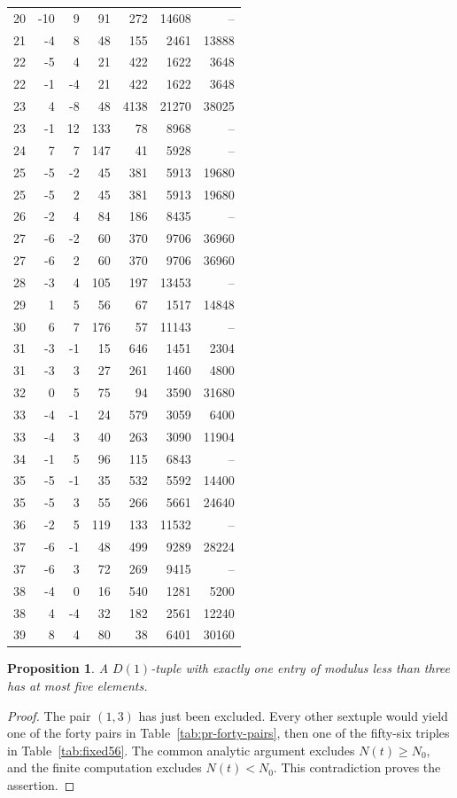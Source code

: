 \documentclass[12pt]{article}
\newtheorem{proposition}[theorem]{Proposition}
\numberwithin{equation}{section}
\begin{document}
\begin{longtable}{r|r r|r|r|r|r}
20 & -10 & 9 & 91 & 272 & 14608 & -- \\
21 & -4 & 8 & 48 & 155 & 2461 & 13888 \\
22 & -5 & 4 & 21 & 422 & 1622 & 3648 \\
22 & -1 & -4 & 21 & 422 & 1622 & 3648 \\
23 & 4 & -8 & 48 & 4138 & 21270 & 38025 \\
23 & -1 & 12 & 133 & 78 & 8968 & -- \\
24 & 7 & 7 & 147 & 41 & 5928 & -- \\
25 & -5 & -2 & 45 & 381 & 5913 & 19680 \\
25 & -5 & 2 & 45 & 381 & 5913 & 19680 \\
26 & -2 & 4 & 84 & 186 & 8435 & -- \\
27 & -6 & -2 & 60 & 370 & 9706 & 36960 \\
27 & -6 & 2 & 60 & 370 & 9706 & 36960 \\
28 & -3 & 4 & 105 & 197 & 13453 & -- \\
29 & 1 & 5 & 56 & 67 & 1517 & 14848 \\
30 & 6 & 7 & 176 & 57 & 11143 & -- \\
31 & -3 & -1 & 15 & 646 & 1451 & 2304 \\
31 & -3 & 3 & 27 & 261 & 1460 & 4800 \\
32 & 0 & 5 & 75 & 94 & 3590 & 31680 \\
33 & -4 & -1 & 24 & 579 & 3059 & 6400 \\
33 & -4 & 3 & 40 & 263 & 3090 & 11904 \\
34 & -1 & 5 & 96 & 115 & 6843 & -- \\
35 & -5 & -1 & 35 & 532 & 5592 & 14400 \\
35 & -5 & 3 & 55 & 266 & 5661 & 24640 \\
36 & -2 & 5 & 119 & 133 & 11532 & -- \\
37 & -6 & -1 & 48 & 499 & 9289 & 28224 \\
37 & -6 & 3 & 72 & 269 & 9415 & -- \\
38 & -4 & 0 & 16 & 540 & 1281 & 5200 \\
38 & 4 & -4 & 32 & 182 & 2561 & 12240 \\
39 & 8 & 4 & 80 & 38 & 6401 & 30160 \\
\end{longtable}
\begin{proposition}\label{prop:one-small}
A $D(1)$-tuple with exactly one entry of modulus less than three has
at most five elements.
\end{proposition}
\begin{proof}
The pair $(1,3)$ has just been excluded. Every other sextuple would
yield one of the forty pairs in Table~\ref{tab:pr-forty-pairs}, then
one of the fifty-six triples in Table~\ref{tab:fixed56}. The common
analytic argument excludes $N(t)\ge N_0$, and the finite computation
excludes $N(t)<N_0$. This contradiction proves the assertion.
\end{proof}
\end{document}
